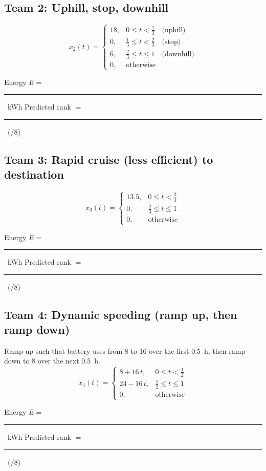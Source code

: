 \documentclass[11pt]{article}
\newcommand{\Eblank}{\rule{3cm}{0.4pt}}
\newcommand{\Rankblank}{\rule{3cm}{0.4pt}}
\begin{document}
\subsection*{Team 2: Uphill, stop, downhill}
\[
x_2(t)=
\begin{cases}
18, & 0 \le t < \tfrac{1}{3} \quad\text{(uphill)}\\
0,  & \tfrac{1}{3} \le t < \tfrac{2}{3} \quad\text{(stop)}\\
6,  & \tfrac{2}{3} \le t \le 1 \quad\text{(downhill)}\\
0,  & \text{otherwise}
\end{cases}
\]
\begin{tcolorbox}[title=Team 2: Record your results]
Energy \(E=\) \Eblank\ \si{kWh} \quad\quad Predicted rank \(=\) \Rankblank\ (/8)
\end{tcolorbox}

\subsection*{Team 3: Rapid cruise (less efficient) to destination}
\[
x_3(t)=
\begin{cases}
13.5, & 0 \le t < \tfrac{2}{3} \\
0,    & \tfrac{2}{3} \le t \le 1 \\
0,    & \text{otherwise}
\end{cases}
\]
\begin{tcolorbox}[title=Team 3: Record your results]
Energy \(E=\) \Eblank\ \si{kWh} \quad\quad Predicted rank \(=\) \Rankblank\ (/8)
\end{tcolorbox}

\subsection*{Team 4: Dynamic speeding (ramp up, then ramp down)}
Ramp up such that battery uses from 8 to 16 over the first \SI{0.5}{h}, then ramp down to 8 over the next \SI{0.5}{h}.
\[
x_4(t)=
\begin{cases}
8 + 16\,t, & 0 \le t < \tfrac{1}{2} \\
24 - 16\,t, & \tfrac{1}{2} \le t \le 1 \\
0, & \text{otherwise}
\end{cases}
\]
\begin{tcolorbox}[title=Team 4: Record your results]
Energy \(E=\) \Eblank\ \si{kWh} \quad\quad Predicted rank \(=\) \Rankblank\ (/8)
\end{tcolorbox}
\end{document}

